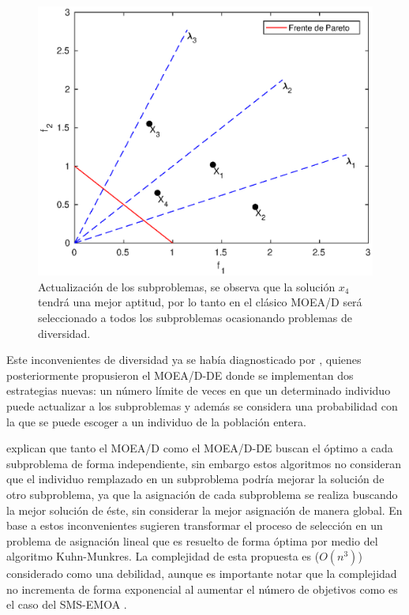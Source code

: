 \begin{figure}[H]
\centering
\scriptsize
\includegraphics[scale=0.6]
{Figures_Chapter4/Lambda.eps}
\decoRule
\caption{Actualización de los subproblemas, se observa que la solución $x_4$ tendrá una mejor aptitud, por lo tanto en el clásico MOEA/D será seleccionado a todos los subproblemas ocasionando problemas de diversidad.}
\label{fig:Ubicacion_Lambda}
\end{figure}

Este inconvenientes de diversidad ya se había diagnosticado por \cite{li2009multiobjective}, quienes posteriormente propusieron el MOEA/D-DE donde se implementan dos estrategias nuevas: un número límite de veces en que un determinado individuo puede actualizar a los subproblemas y además se considera una probabilidad con la que se puede escoger a un individuo de la población entera.
%

\cite{berengueroptimizacion} explican que tanto el MOEA/D como el MOEA/D-DE buscan el óptimo a cada subproblema de forma independiente, sin embargo estos algoritmos no consideran que el individuo remplazado en un subproblema podría mejorar la solución de otro subproblema, ya que la asignación de cada subproblema se realiza buscando la mejor solución de éste, sin considerar la mejor asignación de manera global.
%
En base a estos inconvenientes sugieren transformar el proceso de selección en un problema de asignación lineal que es resuelto de forma óptima por medio del algoritmo Kuhn-Munkres.
%
La complejidad de esta propuesta es ($O(n^3)$) considerado como una debilidad, aunque es importante notar que la complejidad no incrementa de forma exponencial al aumentar el número de objetivos como es el caso del SMS-EMOA \citep{Joel:SMSEMOA}.


